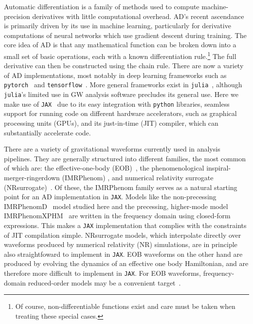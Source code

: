 \documentclass[twocolumn]{aastex631}
\newcommand{\jax}{\texttt{JAX}\xspace}
\begin{document}
Automatic differentiation is a family of methods used to compute machine-precision derivatives with little computational overhead. 
AD's recent ascendance is primarily driven by its use in machine learning, particularly for derivative computations of neural networks which use gradient descent during training.
The core idea of AD is that any mathematical function can be broken down into a small set of basic operations, each with a known differentiation rule.\footnote{
    Of course, non-differentiable functions exist and care must be taken when treating these special cases.
    }
The full derivative can then be constructed using the chain rule.
There are now a variety of AD implementations, most notably in deep learning frameworks such as \texttt{pytorch}~\citep{pytorch} and \texttt{tensorflow}~\citep{tensorflow2015-whitepaper}.
More general frameworks exist in \texttt{julia}~\citep{zygote, forwarddiff}, although \texttt{julia}'s limited use in GW analysis software precludes its general use.
Here we make use of \jax~\citep{jax2018github} due to its easy integration with \texttt{python} libraries, seamless support for running code on different hardware accelerators, such as graphical processing units (GPUs), and its just-in-time (JIT) compiler, which can substantially accelerate code.

There are a variety of gravitational waveforms currently used in analysis pipelines.
They are generally structured into different families, the most common of which are: the effective-one-body (EOB)~\citep{Damour:2008yg,Buonanno:2005xu, Buonanno:2000ef, Buonanno:1998gg, Damour:2000we,Ossokine:2020kjp,Nagar:2021gss,Ramos-Buades:2021adz,Albertini:2021tbt, Cotesta:2020qhw, Bohe:2016gbl}, the phenomenological inspiral-merger-ringerdown (IMRPhenom) \citep{Husa:2015iqa,Khan:2015jqa,Hannam:2013oca,Pratten:2020ceb, Smith:2016qas, Pratten:2020fqn, Garcia-Quiros:2020qpx}, and numerical relativity surrogate (NRsurrogate)~\citep{Blackman:2017pcm,Varma:2018mmi,Varma:2019csw}.
Of these, the IMRPhenom family serves as a natural starting point for an AD implementation in \jax.
Models like the non-precessing IMRPhenomD~\citep{Khan:2015jqa} model studied here and the precessing, higher-mode model IMRPhenomXPHM~\citep{Pratten:2020fqn, Pratten:2020ceb} are written in the frequency domain using closed-form expressions.
This makes a \jax implementation that complies with the constraints of JIT compilation simple.
NRsurrogate models, which interpolate directly over waveforms produced by numerical relativity (NR) simulations, are in principle also straightfoward to implement in \jax.
EOB waveforms on the other hand are produced by evolving the dynamics of an effective one body Hamiltonian, and are therefore more difficult to implement in \jax.
For EOB waveforms, frequency-domain reduced-order models may be a convenient target~\citep[e.g.]{Cotesta:2020qhw}.
\end{document}
